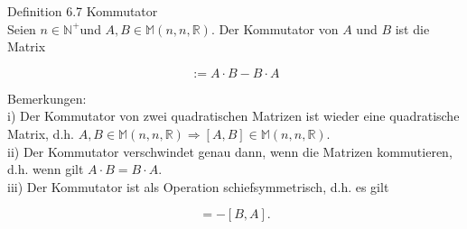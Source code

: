 \documentclass[10pt]{article}
\begin{document}
Definition 6.7 Kommutator\\
Seien $n \in \mathbb{N}^{+}$und $A, B \in \mathbb{M}(n, n, \mathbb{R})$. Der Kommutator von $A$ und $B$ ist die Matrix


\begin{equation*}
[A, B]:=A \cdot B-B \cdot A \tag{6.13}
\end{equation*}


Bemerkungen:\\
i) Der Kommutator von zwei quadratischen Matrizen ist wieder eine quadratische Matrix, d.h. $A, B \in \mathbb{M}(n, n, \mathbb{R}) \Rightarrow[A, B] \in \mathbb{M}(n, n, \mathbb{R})$.\\
ii) Der Kommutator verschwindet genau dann, wenn die Matrizen kommutieren, d.h. wenn gilt $A \cdot B=B \cdot A$.\\
iii) Der Kommutator ist als Operation schiefsymmetrisch, d.h. es gilt


\begin{equation*}
[A, B]=-[B, A] . \tag{6.14}
\end{equation*}
\end{document}
